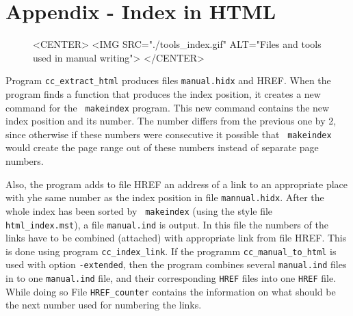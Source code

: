 
\section{Appendix - Index in HTML}


\begin{figure}
\begin{ccHtmlOnly}
<CENTER>
  <IMG SRC="./tools_index.gif" ALT="Files and tools used in manual writing">
</CENTER>
\end{ccHtmlOnly}
\end{figure}



\normalsize Program \verb|cc_extract_html| produces files
\verb|manual.hidx| and HREF. When the program finds a function that
produces the index position, it creates a new command for the {\tt
  makeindex} program. This new command contains the new index position
and its number. The number differs from the previous one by 2, since
otherwise if these numbers were consecutive it possible that {\tt
  makeindex} would create the page range out of these numbers instead
of separate page numbers.

Also, the program adds to file HREF an address of a link to an
appropriate place with yhe same number as the index position in file
\verb|mannual.hidx|.  After the whole index has been sorted by {\tt
  makeindex} (using the style file \verb|html_index.mst|), a file
\verb|manual.ind| is output. In this file the numbers of the links
have to be combined (attached) with appropriate link from file HREF.
This is done using program \verb|cc_index_link|. If the programm
\verb|cc_manual_to_html| is used with option {\tt -extended}, then the
program combines several \verb|manual.ind| files in to one
\verb|manual.ind| file, and their corresponding \verb|HREF| files into
one \verb|HREF| file. While doing so File \verb|HREF_counter| contains
the information on what should be the next number used for numbering
the links.

